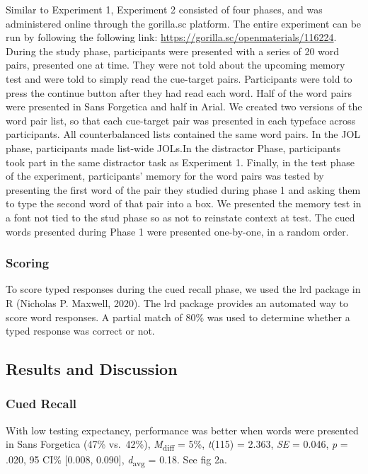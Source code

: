 \documentclass[
  english,
  jou]{apa6}
\begin{document}
Similar to Experiment 1, Experiment 2 consisted of four phases, and was administered online through the gorilla.sc platform. The entire experiment can be run by following the following link: \url{https://gorilla.sc/openmaterials/116224}. During the study phase, participants were presented with a series of 20 word pairs, presented one at time. They were not told about the upcoming memory test and were told to simply read the cue-target pairs. Participants were told to press the continue button after they had read each word. Half of the word pairs were presented in Sans Forgetica and half in Arial. We created two versions of the word pair list, so that each cue-target pair was presented in each typeface across participants. All counterbalanced lists contained the same word pairs. In the JOL phase, participants made list-wide JOLs.In the distractor Phase, participants took part in the same distractor task as Experiment 1. Finally, in the test phase of the experiment, participants' memory for the word pairs was tested by presenting the first word of the pair they studied during phase 1 and asking them to type the second word of that pair into a box. We presented the memory test in a font not tied to the stud phase so as not to reinstate context at test. The cued words presented during Phase 1 were presented one-by-one, in a random order.

\hypertarget{scoring}{%
\subsubsection{Scoring}\label{scoring}}

To score typed responses during the cued recall phase, we used the lrd package in R (Nicholas P. Maxwell, 2020). The lrd package provides an automated way to score word responses. A partial match of 80\% was used to determine whether a typed response was correct or not.

\hypertarget{results-and-discussion-1}{%
\subsection{Results and Discussion}\label{results-and-discussion-1}}

\hypertarget{cued-recall}{%
\subsubsection{Cued Recall}\label{cued-recall}}

With low testing expectancy, performance was better when words were presented in Sans Forgetica (47\% vs.~42\%), \emph{M}\textsubscript{diff} = 5\%, \emph{t}(115) = 2.363, \emph{SE} = 0.046, \emph{p} = .020, 95 CI\% {[}0.008, 0.090{]}, \emph{d}\textsubscript{avg} = 0.18. See fig 2a.
\end{document}

